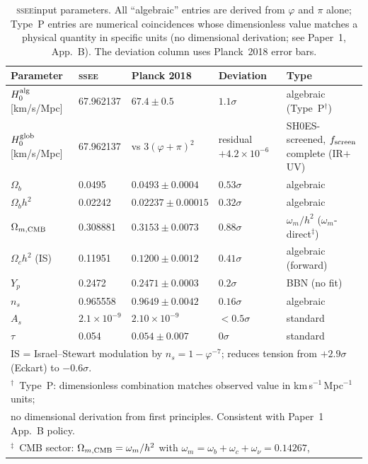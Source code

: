 \documentclass[12pt,a4paper]{article}
\newcommand{\SSEE}{\ifmmode\mathrm{SSEE}\else\textsc{ssee}\fi}
\begin{document}
\begin{table}[ht]
\centering
\caption{\SSEE input parameters. All ``algebraic'' entries are derived
from $\varphi$ and $\pi$ alone; Type~P entries are numerical coincidences
whose dimensionless value matches a physical quantity in specific units
(no dimensional derivation; see Paper~1, App.~B). The deviation column uses
Planck~2018 \citep{PlanckCollaboration2020a} error bars.}
\label{tab:params}
\begin{tabular}{lllll}
\toprule
Parameter & \SSEE & Planck 2018 & Deviation & Type \\
\midrule
$H_0^{\rm alg}$ [km/s/Mpc]     & 67.962137 & $67.4\pm0.5$  & $1.1\sigma$ & algebraic (Type~P$^\dagger$) \\
$H_0^{\rm glob}$ [km/s/Mpc]  & 67.962137 & vs $3(\varphi+\pi)^2$ & residual $+4.2\times10^{-6}$ & SH0ES-screened, $f_{\rm screen}$ complete (IR$+$UV) \\
$\Omega_b$          & 0.0495 & $0.0493\pm0.0004$    & $0.53\sigma$ & algebraic \\
$\Omega_b h^2$      & 0.02242& $0.02237\pm0.00015$ & $0.32\sigma$ & algebraic \\
$\Omega_{m,\rm CMB}$ & 0.308881 & $0.3153\pm0.0073$   & $0.88\sigma$ & $\omega_m/h^2$ ($\omega_m$-direct$^\ddagger$) \\
$\Omega_c h^2$ (IS) & 0.11951& $0.1200\pm0.0012$   & $0.41\sigma$ & algebraic (forward) \\
$Y_p$               & 0.2472 & $0.2471\pm0.0003$   & $0.2\sigma$ & BBN (no fit) \\
$n_s$               & 0.965558& $0.9649\pm0.0042$   & $0.16\sigma$& algebraic \\
$A_s$               & $2.1\times10^{-9}$ & $2.10\times10^{-9}$ & $<0.5\sigma$ & standard \\
$\tau$              & 0.054  & $0.054\pm0.007$     & $0\sigma$   & standard \\
\midrule
\midrule
\multicolumn{5}{l}{\footnotesize IS = Israel--Stewart modulation by $n_s=1-\varphi^{-7}$; reduces tension from $+2.9\sigma$ (Eckart) to $-0.6\sigma$.}\\
\multicolumn{5}{l}{\footnotesize $^\dagger$~Type~P: dimensionless combination matches observed value in km\,s$^{-1}$\,Mpc$^{-1}$ units;}\\
\multicolumn{5}{l}{\footnotesize no dimensional derivation from first principles. Consistent with Paper~1 App.~B policy.}\\
\multicolumn{5}{l}{\footnotesize $^\ddagger$~CMB sector: $\Omega_{m,\rm CMB}=\omega_m/h^2$ with $\omega_m=\omega_b+\omega_c+\omega_\nu=0.14267$,}\\

\end{tabular}
\end{table}
\end{document}
